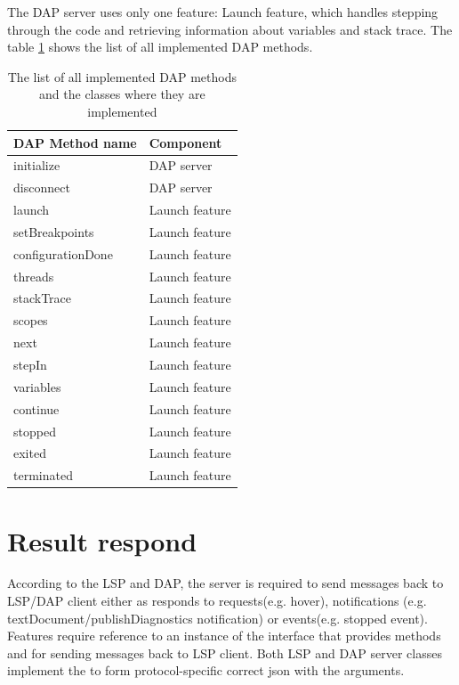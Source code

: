 The DAP server uses only one feature: Launch feature, which handles stepping through the code and retrieving information about variables and stack trace. The table \cref{DAP_methods} shows the list of all implemented DAP methods.

\begin{longtable}{ll}
	\caption{The list of all implemented DAP methods and the classes where they are implemented}
	\label{DAP_methods}   \\ \toprule
	\textbf{DAP Method name} & \textbf{Component} \\ \midrule
	initialize  & DAP server     \\
	disconnect    & DAP server     \\
	launch & Launch feature \\
	setBreakpoints  &  Launch feature    \\
	configurationDone  & Launch feature     \\
	threads  &  Launch feature    \\
	stackTrace & Launch feature \\
	scopes  & Launch feature     \\
	next  & Launch feature     \\
	stepIn  & Launch feature     \\
	variables  & Launch feature     \\
	continue  & Launch feature \\
 stopped & Launch feature \\
 exited  & Launch feature \\
 terminated & Launch feature \\\bottomrule
\end{longtable}

\section{Result respond}

According to the LSP and DAP, the server is required to send messages back to LSP/DAP client either as responds to requests(e.g. hover), notifications (e.g. textDocument/publishDiagnostics notification) or events(e.g. stopped event). Features require reference to an instance of the  interface that provides methods  and  for sending messages back to LSP client. Both LSP and DAP server classes implement the  to form protocol-specific correct json with the arguments.

